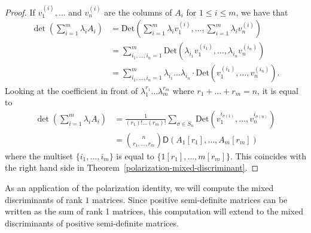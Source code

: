 \documentclass{puthesis-UG}
\begin{document}
\begin{proof}
	If $v_1^{(i)}, \ldots$ and $v_n^{(i)}$ are the columns of $A_i$ for $1 \leq i \leq m$, we have that 
	\begin{align*}
		\det \left ( \sum_{i = 1}^m \lambda_i A_i \right ) & = \text{Det} \left ( \sum_{i = 1}^m \lambda_i v_1^{(i)}, \ldots, \sum_{i = 1}^m \lambda_i v_n^{(i)} \right ) \\
		& = \sum_{i_1, \ldots, i_n = 1}^m \text{Det} (\lambda_{i_1} v_{1}^{(i_1)}, \ldots, \lambda_{i_n} v_{n}^{(i_n)} ) \\
		& = \sum_{i_1, \ldots, i_n = 1}^m \lambda_{i_1} \ldots \lambda_{i_n} \cdot \text{Det}(v_{1}^{(i_1)}, \ldots, v_{n}^{(i_n)}).
	\end{align*}
	Looking at the coefficient in front of $\lambda_1^{r_1} \ldots \lambda_m^{r_m}$ where $r_1 + \ldots + r_m = n$, it is equal to 
	\begin{align*}
		[\lambda_1^{r_1} \ldots \lambda_M^{r_m}] \det \left ( \sum_{i = 1}^m \lambda_i A_i \right ) & = \frac{1}{(r_1)! \ldots (r_m)!} \sum_{\sigma \in S_n} \text{Det}(v_1^{i_{\sigma(1)}}, \ldots, v_n^{i_{\sigma(n)}}) \\
		& = \binom{n}{r_1,\ldots, r_m} \mathsf{D}(A_1[r_1], \ldots, A_m[r_m])
	\end{align*}
	where the multiset $\{i_1, \ldots, i_m\}$ is equal to $\{1[r_1], \ldots, m[r_m]\}.$ This coincides with the right hand side in Theorem~\ref{polarization-mixed-discriminant}.
\end{proof}

As an application of the polarization identity, we will compute the mixed discriminants of rank $1$ matrices. Since positive semi-definite matrices can be written as the sum of rank 1 matrices, this computation will extend to the mixed discriminants of positive semi-definite matrices. 
\end{document}
